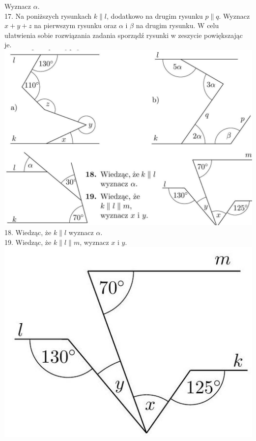 \documentclass[10pt]{article}
\begin{document}
Wyznacz \(\alpha\).\\
17. Na poniższych rysunkach \(k \| l\), dodatkowo na drugim rysunku \(p \| q\). Wyznacz \(x+y+z\) na pierwszym rysunku oraz \(\alpha\) i \(\beta\) na drugim rysunku. W celu ułatwienia sobie rozwiązania zadania sporządź rysunki w zeszycie powiększając je.\\
\includegraphics[max width=\textwidth, center]{2024_11_21_71f62bd117d375398909g-015(2)}\\
18. Wiedząc, że \(k \| l\) wyznacz \(\alpha\).\\
19. Wiedząc, że \(k\|l\| m\), wyznacz \(x\) i \(y\).\\
\includegraphics[max width=\textwidth, center]{2024_11_21_71f62bd117d375398909g-015}
\end{document}
